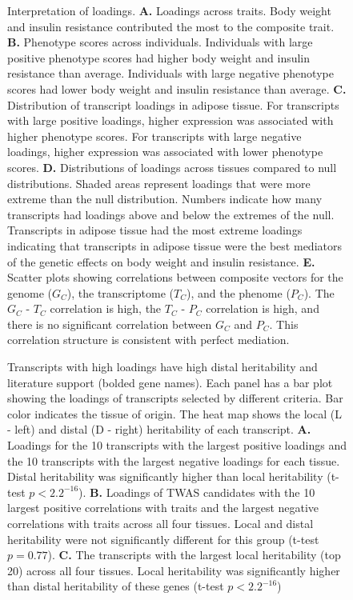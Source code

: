 \documentclass[
]{article}
\begin{document}
\begin{figure}[ht!]
\caption{Interpretation of loadings. \textbf{A.} Loadings across traits. 
Body weight and insulin resistance contributed the most to the composite 
trait. \textbf{B.} Phenotype scores across individuals. Individuals with large 
positive phenotype scores had higher body weight and insulin resistance 
than average. Individuals with large negative phenotype scores had lower 
body weight and insulin resistance than average. \textbf{C.} Distribution of 
transcript loadings in adipose tissue. For transcripts with large positive 
loadings, higher expression was associated with higher phenotype scores. 
For transcripts with large negative loadings, higher expression was associated 
with lower phenotype scores. \textbf{D.} Distributions of loadings across 
tissues compared to null distributions. Shaded areas represent loadings that 
were more extreme than the null distribution. Numbers indicate how many 
transcripts had loadings above and below the extremes of the null. Transcripts 
in adipose tissue had the most extreme loadings indicating that transcripts in 
adipose tissue were the best mediators of the genetic effects on body weight 
and insulin resistance. \textbf{E.} Scatter plots showing correlations between 
composite vectors for the genome ($G_C$), the transcriptome ($T_C$), and the 
phenome ($P_C$). The $G_C$ - $T_C$ correlation is high, the $T_C$ - $P_C$ 
correlation is high, and there is no significant correlation between $G_C$ 
and $P_C$. This correlation structure is consistent with perfect mediation.
}
\label{fig:interpretation}
\end{figure}

\begin{figure}[ht!]
\caption{Transcripts with high loadings have high distal heritability 
and literature support (bolded gene names). Each panel has a bar plot 
showing the loadings of transcripts selected by different criteria. Bar color indicates the 
tissue of origin. The heat map shows the local (L - left) and distal 
(D - right) heritability of each transcript. \textbf{A.} Loadings for 
the 10 transcripts with the largest positive loadings and the 10 
transcripts with the largest negative loadings for each tissue. 
Distal heritability was significantly higher than local heritability 
(t-test $p < 2.2^{-16}$). \textbf{B.} Loadings of TWAS candidates 
with the 10 largest positive correlations with traits and the largest 
negative correlations with traits across all four tissues. Local and 
distal heritability were not significantly different for this group 
(t-test $p = 0.77$). \textbf{C.} The transcripts with the largest 
local heritability (top 20) across all four tissues. Local heritability 
was significantly higher than distal heritability of these genes (t-test 
$p < 2.2^{-16}$)
}
\label{fig:loading_heritability}
\end{figure}
\end{document}

